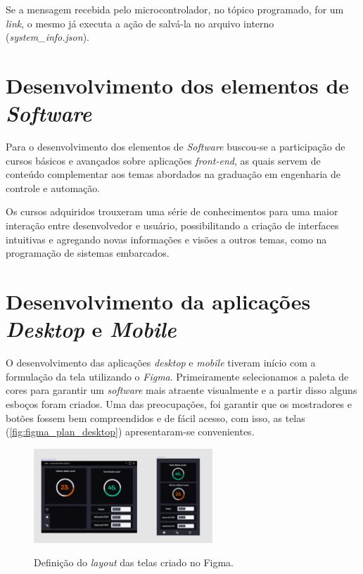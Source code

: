 Se a mensagem recebida pelo microcontrolador, no tópico programado, for um \textit{link}, o mesmo já executa a ação de salvá-la no arquivo interno (\textit{system\_info.json}).






\section{Desenvolvimento dos elementos de \textit{Software}}


Para o desenvolvimento dos elementos de \textit{Software} buscou-se a participação de cursos básicos e avançados sobre aplicações \textit{front-end}, as quais servem de conteúdo complementar aos temas abordados na graduação em engenharia de controle e automação.

Os cursos adquiridos trouxeram uma série de conhecimentos para uma maior interação entre desenvolvedor e usuário, possibilitando a criação de interfaces intuitivas e agregando novas informações e visões a outros temas, como na programação de sistemas embarcados.




\section{Desenvolvimento da aplicações \textit{Desktop} e \textit{Mobile}}

O desenvolvimento das aplicações \textit{desktop} e \textit{mobile} tiveram início com a formulação da tela utilizando o \textit{Figma}. Primeiramente selecionamos a paleta de cores para garantir um \textit{software} mais atraente visualmente e a partir disso alguns esboços foram criados. Uma das preocupações, foi garantir que os mostradores e botões fossem bem compreendidos e de fácil acesso, com isso, as telas (\autoref{fig:figma_plan_desktop}) apresentaram-se convenientes.

\begin{figure}[H]
	\centering
	\caption{Definição do \textit{layout} das telas criado no Figma.}
	\includegraphics[width=0.6\textwidth]{figuras/figma_plan.png}
	\label{fig:figma_plan_desktop}
\end{figure}



